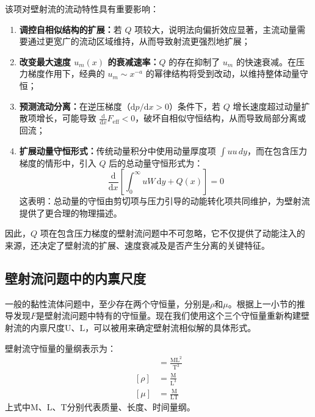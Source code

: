 该项对壁射流的流动特性具有重要影响：

\begin{enumerate}
    \item \textbf{调控自相似结构的扩展：}若 \( Q \) 项较大，说明法向偏折效应显著，主流动量需要通过更宽广的流动区域维持，从而导致射流更强烈地扩展；
    
    \item \textbf{改变最大速度 \( u_m(x) \) 的衰减速率：}\( Q \) 的存在抑制了 \( u_m \) 的快速衰减。在压力梯度作用下，经典的 \( u_m \sim x^{-a} \) 的幂律结构将受到改动，以维持整体动量守恒；
    
    \item \textbf{预测流动分离：}在逆压梯度（\( \mathrm{d}p/\mathrm{d}x > 0 \)）条件下，若 \( Q \) 增长速度超过动量扩散项增长，可能导致 \( \frac{\mathrm{d}}{\mathrm{d}x}F_{\text{eff}} < 0 \)，破坏自相似守恒结构，从而导致局部分离或回流；
    
    \item \textbf{扩展动量守恒形式：}传统动量积分中使用动量厚度项 \( \int uu\,dy \)，而在包含压力梯度的情形中，引入 \( Q \) 后的总动量守恒形式为：
    \[
        \frac{\mathrm{d}}{\mathrm{d}x} \left[ \int_0^\infty uW\,\mathrm{d}y + Q(x) \right] = 0
    \]
    这表明：总动量的守恒由剪切项与压力引导的动能转化项共同维护，为壁射流提供了更合理的物理描述。
\end{enumerate}

因此，\( Q \) 项在包含压力梯度的壁射流问题中不可忽略，它不仅提供了动能注入的来源，还决定了壁射流的扩展、速度衰减及是否产生分离的关键特征。



\subsection{壁射流问题中的内禀尺度}
一般的黏性流体问题中，至少存在两个守恒量，分别是$\rho$和$\mu$。根据上一小节的推导发现$F$是壁射流问题中特有的守恒量。现在我们使用这个三个守恒量重新构建壁射流的内禀尺度$\mathrm{U}$、$\mathrm{L}$，可以被用来确定壁射流相似解的具体形式。

壁射流守恒量的量纲表示为：
\begin{align}
    [F]&=\frac{\mathrm{ML^{2}}}{\mathrm{T}^{3}}\\
    [\rho]&=\frac{\mathrm{M}}{\mathrm{L^{3}}}\\
    [\mu]&=\frac{\mathrm{M}}{\mathrm{LT}}
\end{align}
上式中$\mathrm{M}$、$\mathrm{L}$、$\mathrm{T}$分别代表质量、长度、时间量纲。

